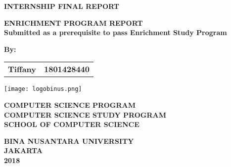 \renewcommand{\baselinestretch}{1.5}\normalsize
    \begin{center}
        \textbf{INTERNSHIP FINAL REPORT}
        
        \vspace{1.5cm}
        \textbf{ENRICHMENT PROGRAM REPORT}\\
        \textbf{Submitted as a prerequisite to pass Enrichment Study Program}
        
        \vspace{1cm}
        \textbf{By:}
        
        \begin{tabular}{ll}
        \textbf{Tiffany} & \textbf{1801428440}
        \end{tabular}
         
        \vfill
        
        \texttt{[image: logobinus.png]}
        
        \vspace{4cm}
        \textbf{COMPUTER SCIENCE PROGRAM}\\
        \textbf{COMPUTER SCIENCE STUDY PROGRAM}\\
        \textbf{SCHOOL OF COMPUTER SCIENCE}	
        
		\vspace{1.5cm}        
        
        \textbf{BINA NUSANTARA UNIVERSITY}\\
        \textbf{JAKARTA}\\
        \textbf{2018}
    \end{center}
